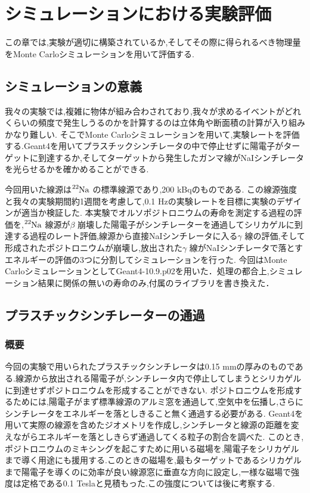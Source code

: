 \chapter{シミュレーションにおける実験評価}\label{simulation}

この章では,実験が適切に構築されているか,そしてその際に得られるべき物理量をMonte Carloシミュレーションを用いて評価する.

\section{シミュレーションの意義}

我々の実験では,複雑に物体が組み合わされており,我々が求めるイベントがどれくらいの頻度で発生しうるのかを計算するのは立体角や断面積の計算が入り組みかなり難しい.
そこでMonte Carloシミュレーションを用いて,実験レートを評価する.Geant4を用いてプラスチックシンチレータの中で停止せずに陽電子がターゲットに到達するか,そしてターゲットから発生したガンマ線がNaIシンチレータを光らせるかを確かめることができる.

今回用いた線源は$\ce{^{22}Na}$ の標準線源であり,200 kBqのものである.
この線源強度と我々の実験期間約1週間を考慮して,0.1 Hzの実験レートを目標に実験のデザインが適当か検証した.
本実験でオルソポジトロニウムの寿命を測定する過程の評価を,$\ce{^{22}Na}$ 線源が$\beta$ 崩壊した陽電子がシンチレーターを通過してシリカゲルに到達する過程のレート評価,線源から直接NaIシンチレータに入る$\gamma$ 線の評価,そして形成されたポジトロニウムが崩壊し,放出された$\gamma$ 線がNaIシンチレータで落とすエネルギーの評価の3つに分割してシミュレーションを行った.
今回はMonte CarloシミュレーションとしてGeant4-10.9.p02を用いた．処理の都合上,シミュレーション結果に関係の無いの寿命のみ,付属のライブラリを書き換えた．



\section{プラスチックシンチレーターの通過}
\label{plastic_scintillator_effect}

\subsection{概要}
今回の実験で用いられたプラスチックシンチレータは0.15 mmの厚みのものである.線源から放出される陽電子が,シンチレータ内で停止してしまうとシリカゲルに到達せずポジトロニウムを形成することができない.
ポジトロニウムを形成するためには,陽電子がまず標準線源のアルミ窓を通過して,空気中を伝播し,さらにシンチレータをエネルギーを落としきること無く通過する必要がある.
Geant4を用いて実際の線源を含めたジオメトリを作成し,シンチレータと線源の距離を変えながらエネルギーを落としきらず通過してくる粒子の割合を調べた.
このとき,ポジトロニウムのミキシングを起こすために用いる磁場を,陽電子をシリカゲルまで導く用途にも援用する.このときの磁場を,最もターゲットであるシリカゲルまで陽電子を導くのに効率が良い線源窓に垂直な方向に設定し,一様な磁場で強度は定格である0.1 Teslaと見積もった.この強度については後に考察する.

